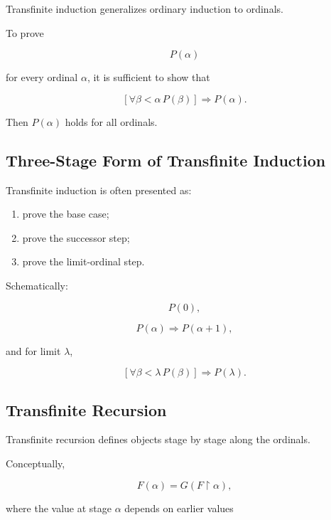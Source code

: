 Transfinite induction generalizes ordinary induction to ordinals.

To prove

\[
\boxed{
P(\alpha)
}
\]

for every ordinal \(\alpha\), it is sufficient to show that

\[
\boxed{
\left[
\forall\beta<\alpha
\,
P(\beta)
\right]
\Longrightarrow
P(\alpha).
}
\]

Then \(P(\alpha)\) holds for all ordinals.

\subsection{Three-Stage Form of Transfinite Induction}
\label{subsec:three-stage-transfinite-induction}

Transfinite induction is often presented as:

\begin{enumerate}
    \item prove the base case;
    \item prove the successor step;
    \item prove the limit-ordinal step.
\end{enumerate}

Schematically:

\[
\boxed{
P(0),
}
\]

\[
\boxed{
P(\alpha)
\Longrightarrow
P(\alpha+1),
}
\]

and for limit \(\lambda\),

\[
\boxed{
\left[
\forall\beta<\lambda
\,
P(\beta)
\right]
\Longrightarrow
P(\lambda).
}
\]

\subsection{Transfinite Recursion}
\label{subsec:transfinite-recursion}

Transfinite recursion defines objects stage by stage along the ordinals.

Conceptually,

\[
\boxed{
F(\alpha)
=
G
\left(
F\restriction\alpha
\right),
}
\]

where the value at stage \(\alpha\) depends on earlier values

